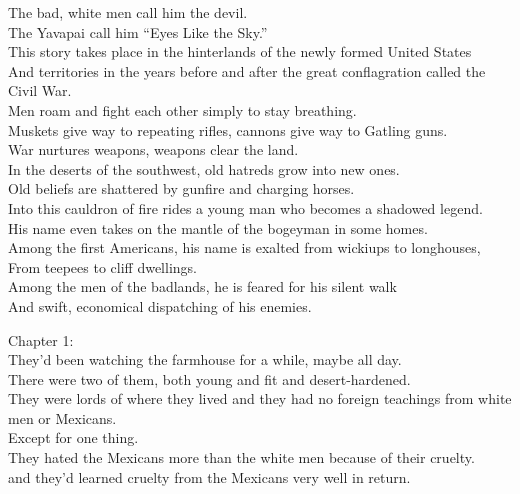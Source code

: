
\label{album:eyes-like-the-sky}




The bad, white men call him the devil. \\
The Yavapai call him ``Eyes Like the Sky.'' \\

This story takes place in the hinterlands of the newly formed United States \\
And territories in the years before and after the great conflagration called the Civil War. \\
Men roam and fight each other simply to stay breathing. \\
Muskets give way to repeating rifles, cannons give way to Gatling guns. \\
War nurtures weapons, weapons clear the land. \\

In the deserts of the southwest, old hatreds grow into new ones. \\
Old beliefs are shattered by gunfire and charging horses. \\
Into this cauldron of fire rides a young man who becomes a shadowed legend. \\
His name even takes on the mantle of the bogeyman in some homes. \\

Among the first Americans, his name is exalted from wickiups to longhouses, \\
From teepees to cliff dwellings. \\
Among the men of the badlands, he is feared for his silent walk \\
And swift, economical dispatching of his enemies. \\




Chapter 1: \\

They'd been watching the farmhouse for a while, maybe all day. \\
There were two of them, both young and fit and desert-hardened. \\
They were lords of where they lived and they had no foreign teachings from white men or Mexicans. \\
Except for one thing. \\
They hated the Mexicans more than the white men because of their cruelty. \\
and they'd learned cruelty from the Mexicans very well in return. \\

